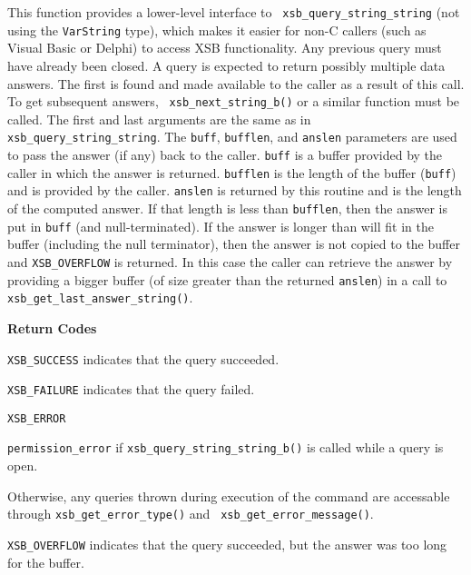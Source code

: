 \begin{description}
%
This function provides a lower-level interface to {\tt
  xsb\_query\_string\_string} (not using the {\tt VarString} type),
which makes it easier for non-C callers (such as Visual Basic or
Delphi) to access XSB functionality.  Any previous query must have
already been closed.  A query is expected to return possibly multiple
data answers.  The first is found and made available to the caller as
a result of this call.  To get subsequent answers, {\tt
  xsb\_next\_string\_b()} or a similar function must be called.  The
first and last arguments are the same as in {\tt
  xsb\_query\_string\_string}.  The \verb|buff|, \verb|bufflen|, and
\verb|anslen| parameters are used to pass the answer (if any) back to
the caller.  \verb|buff| is a buffer provided by the caller in which
the answer is returned.  \verb|bufflen| is the length of the buffer
(\verb|buff|) and is provided by the caller.  \verb|anslen| is
returned by this routine and is the length of the computed answer.  If
that length is less than \verb|bufflen|, then the answer is put in
\verb|buff| (and null-terminated).  If the answer is longer than will
fit in the buffer (including the null terminator), then the answer is
not copied to the buffer and {\tt XSB\_OVERFLOW} is returned.  In this
case the caller can retrieve the answer by providing a bigger buffer
(of size greater than the returned \verb|anslen|) in a call to {\tt
  xsb\_get\_last\_answer\_string()}.

{\bf Return Codes}  
\bi
\item {\tt XSB\_SUCCESS} indicates that the query succeeded.
%
\item {\tt XSB\_FAILURE} indicates that the query failed.
%
\item {\tt XSB\_ERROR} 
\bi
\item {\tt permission\_error} if {\tt xsb\_query\_string\_string\_b()} is
  called while a query is open.
%
\item Otherwise, any queries thrown during execution of the command
  are accessable through {\tt xsb\_get\_error\_type()} and {\tt
    xsb\_get\_error\_message()}.
\ei

\item {\tt XSB\_OVERFLOW} indicates that the query succeeded, but the
  answer was too long for the buffer.
%
\ei


\end{description}
